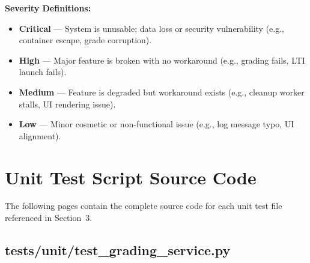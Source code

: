 \documentclass[12pt, letterpaper]{article}
\begin{document}
\textbf{Severity Definitions:}
\begin{itemize}
    \item \textbf{Critical} --- System is unusable; data loss or security vulnerability (e.g., container escape, grade corruption).
    \item \textbf{High} --- Major feature is broken with no workaround (e.g., grading fails, LTI launch fails).
    \item \textbf{Medium} --- Feature is degraded but workaround exists (e.g., cleanup worker stalls, UI rendering issue).
    \item \textbf{Low} --- Minor cosmetic or non-functional issue (e.g., log message typo, UI alignment).
\end{itemize}

\newpage
\appendix
\section{Unit Test Script Source Code}
\label{appendix:scripts}

The following pages contain the complete source code for each unit test file referenced in Section~3.

\subsection{tests/unit/test\_grading\_service.py}
\end{document}
